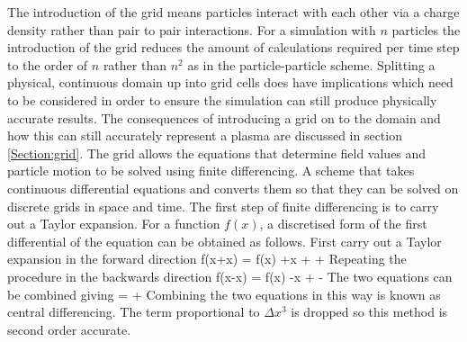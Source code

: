 

The introduction of the grid means particles interact with each other via a charge density rather than pair to pair interactions. For a simulation with $n$ particles the introduction of the grid reduces the amount of calculations required per time step to the order of $n$ rather than $n^2$ as in the particle-particle scheme. Splitting a physical, continuous domain  up into grid cells does have implications which need to be considered in order to ensure the simulation can still produce physically accurate results. The consequences of introducing a grid on to the domain and how this can still accurately represent a plasma are discussed in section \ref{Section:grid}. The grid allows the equations that determine field values and particle motion to be solved using finite differencing. A scheme that takes continuous differential equations and converts them so that they can be solved on discrete grids in space and time. The first step of finite differencing is to carry out a Taylor expansion. For a function $f(x)$, a discretised form of the first differential of the equation can be obtained as follows. First carry out a Taylor expansion in the forward direction
\be
f(x+\Delta x) = f(x) +\Delta x  +  +  
\ee
Repeating the procedure in the backwards direction  
\be
f(x-\Delta x) = f(x) -\Delta x  +  -  
\ee
The two equations can be combined giving 
\be
  =  +   
\ee 
Combining the two equations in this way is known as central differencing. The term proportional to $\Delta x^3$ is dropped so this method is second order accurate.

